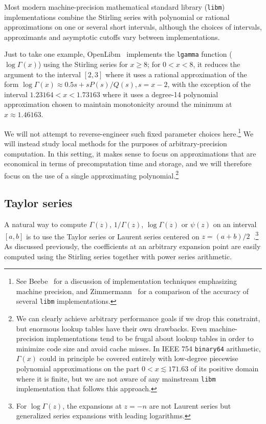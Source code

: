 \documentclass[reqno]{amsart}
\theoremstyle{definition}
\begin{document}
Most modern machine-precision mathematical standard library (\texttt{libm}) implementations
combine the Stirling series with
polynomial or rational approximations on one or several short intervals,
although the choices of intervals, approximants and asymptotic cutoffs
vary between implementations.

Just to take one example,
OpenLibm~\cite{OpenLibm2021} implements the \texttt{lgamma} function ($\log \Gamma(x)$) using
the Stirling series for $x \ge 8$; for $0 < x < 8$,
it reduces the argument to the interval $[2, 3]$
where it uses a rational approximation of the form $\log \Gamma(x) \approx 0.5 s + s P(s)/Q(s), s = x - 2$,
with the exception of the interval $1.23164 < x < 1.73163$ where it uses
a degree-14 polynomial approximation chosen
to maintain monotonicity
around the minimum at $x \approx 1.46163$.

We will not attempt to reverse-engineer such fixed parameter choices here.\footnote{See Beebe~\cite{beebe2017mathematical} for a discussion
of implementation techniques emphasizing machine precision,
and Zimmermann~\cite{Zimmermann2021}
for a comparison of the accuracy of several \texttt{libm} implementations.}
We will instead study local methods for the purposes of arbitrary-precision computation.
In this setting, it makes sense to focus on approximations that are economical
in terms of precomputation time and storage,
and we will therefore focus on the use of
a single approximating polynomial.\footnote{We can clearly achieve arbitrary performance goals
if we drop this constraint, but enormous lookup tables have their own drawbacks.
Even machine-precision implementations tend to be frugal about lookup tables
in order to minimize code size and avoid cache misses. In IEEE 754 \texttt{binary64} arithmetic,
$\Gamma(x)$ could in principle be covered entirely with low-degree piecewise polynomial
approximations on the part $0 < x \lesssim 171.63$ of its positive domain
where it is finite, but we are not aware of any mainstream \texttt{libm} implementation that follows this approach.}

\subsection{Taylor series}
\label{sect:taylor}

A natural way to compute $\Gamma(z)$, $1/\Gamma(z)$, $\log \Gamma(z)$ or $\psi(z)$
on an interval $[a,b]$ is to
use the Taylor series or Laurent series centered on $z = (a+b)/2$~\cite{Wrench1968,Fransen1980}.\footnote{For $\log \Gamma(z)$, the expansions at $z = -n$ are not Laurent series but generalized series expansions with leading
logarithms.}
As discussed previously, the coefficients
at an arbitrary expansion point are easily computed using
the Stirling series together with power series arithmetic.
\end{document}
